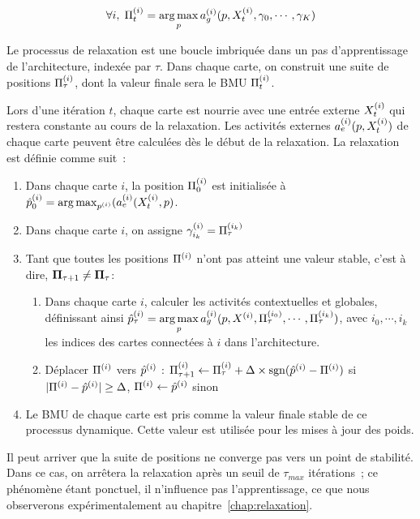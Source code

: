 \documentclass[../main]{subfiles}
\begin{document}
\begin{equation}
\forall i, \; \Pi^{({i})}_t = \operatorname*{arg\,max}\limits_p a_g^{({i})}(p, X^{({i})}_t, \gamma_0, \cdots, \gamma_K)
\end{equation}

Le processus de relaxation est une boucle imbriquée dans un pas d'apprentissage de l'architecture, indexée par $\tau$. Dans chaque carte, on construit une suite de positions $\Pi^{({i})}_\tau$, dont la valeur finale sera le BMU $\Pi^{({i})}_t$.

Lors d'une itération $t$, chaque carte est nourrie avec une entrée externe $X^{({i})}_t$ qui restera constante au cours de la relaxation. 
Les activités externes $a_e^{({i})}(p, X^{({i})}_t)$ de chaque carte peuvent être calculées dès le début de la relaxation.
La relaxation est définie comme suit~:
\begin{enumerate}
\item Dans chaque carte $i$, la position $\Pi^{({i})}_0$ est initialisée à $\hat{p}^{({i})}_0 = \operatorname*{arg\,max}_{p^{({i})}}(a_e^{({i})}(X^{({i})}_t,p)$.
\item Dans chaque carte $i$, on assigne $\gamma_{i_k}^{({i})} = \Pi^{({i_k})}_\tau$
\item Tant que toutes les positions $\Pi^{({i})}$ n'ont pas atteint une valeur stable, c'est à dire, $\mathbf{\Pi}_{\tau+1} \neq \mathbf{\Pi}_\tau$:
	\begin{enumerate}
	\item Dans chaque carte $i$, calculer les activités contextuelles et globales, définissant ainsi $\hat{p}^{({i})}_\tau = \operatorname*{arg\,max}\limits_p a_g^{({i})}(p,X^{({i})}, \Pi^{({i_0})}_\tau,\cdots,\Pi^{({i_k})}_\tau)$, avec $i_0, \cdots, i_k$ les indices des cartes connectées à $i$ dans l'architecture.
	\item Déplacer $\Pi^{({i})}$ vers $\hat{p}^{({i})}$ : $\Pi^{({i})}_{\tau +1} \leftarrow \Pi^{({i})}_\tau + \Delta \times \operatorname{sgn}(\hat{p}^{({i})} - \Pi^{({i})})$ si $\lvert \Pi^{({i})}- \hat{p}^{({i})}\rvert \geq \Delta$, $\Pi^{({i})} \leftarrow \hat{p}^{({i})}$ sinon
	\end{enumerate}
\item Le BMU de chaque carte est pris comme la valeur finale stable de ce processus dynamique. Cette valeur est utilisée pour les mises à jour des poids.
\end{enumerate}

Il peut arriver que la suite de positions ne converge pas vers un point de stabilité. Dans ce cas, on arrêtera la relaxation après un seuil de $\tau_{max}$ itérations~; ce phénomène étant ponctuel, il n'influence pas l'apprentissage, ce que nous observerons expérimentalement au chapitre~\ref{chap:relaxation}.
\end{document}
